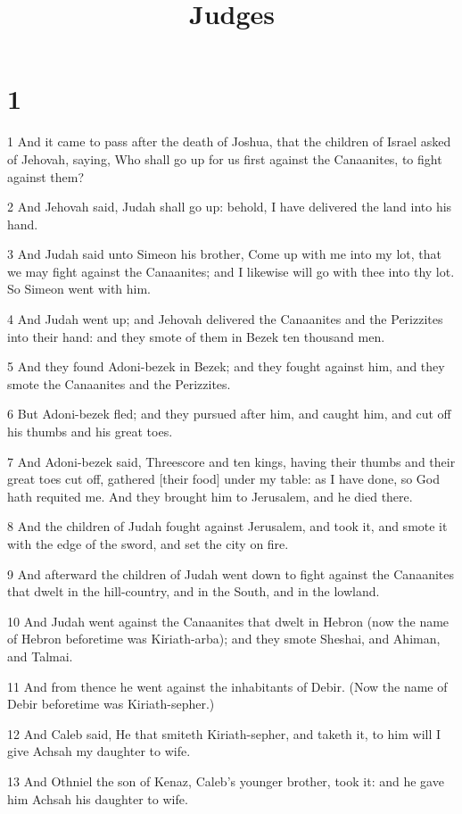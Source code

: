 

\title{Judges}

\chapter{1}

\par 1 And it came to pass after the death of Joshua, that the children of Israel asked of Jehovah, saying, Who shall go up for us first against the Canaanites, to fight against them?
\par 2 And Jehovah said, Judah shall go up: behold, I have delivered the land into his hand.
\par 3 And Judah said unto Simeon his brother, Come up with me into my lot, that we may fight against the Canaanites; and I likewise will go with thee into thy lot. So Simeon went with him.
\par 4 And Judah went up; and Jehovah delivered the Canaanites and the Perizzites into their hand: and they smote of them in Bezek ten thousand men.
\par 5 And they found Adoni-bezek in Bezek; and they fought against him, and they smote the Canaanites and the Perizzites.
\par 6 But Adoni-bezek fled; and they pursued after him, and caught him, and cut off his thumbs and his great toes.
\par 7 And Adoni-bezek said, Threescore and ten kings, having their thumbs and their great toes cut off, gathered [their food] under my table: as I have done, so God hath requited me. And they brought him to Jerusalem, and he died there.
\par 8 And the children of Judah fought against Jerusalem, and took it, and smote it with the edge of the sword, and set the city on fire.
\par 9 And afterward the children of Judah went down to fight against the Canaanites that dwelt in the hill-country, and in the South, and in the lowland.
\par 10 And Judah went against the Canaanites that dwelt in Hebron (now the name of Hebron beforetime was Kiriath-arba); and they smote Sheshai, and Ahiman, and Talmai.
\par 11 And from thence he went against the inhabitants of Debir. (Now the name of Debir beforetime was Kiriath-sepher.)
\par 12 And Caleb said, He that smiteth Kiriath-sepher, and taketh it, to him will I give Achsah my daughter to wife.
\par 13 And Othniel the son of Kenaz, Caleb's younger brother, took it: and he gave him Achsah his daughter to wife.
